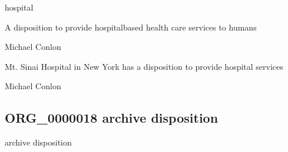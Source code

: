 \documentclass[letterpaper,10pt,english]{sphinxmanual}
\begin{document}
\begin{sphinxShadowBox}

\sphinxAtStartPar
hospital
\end{sphinxShadowBox}

\begin{sphinxShadowBox}

\sphinxAtStartPar
A disposition to provide hospital\sphinxhyphen{}based health care services to humans
\end{sphinxShadowBox}

\begin{sphinxShadowBox}

\sphinxAtStartPar
Michael Conlon 
\end{sphinxShadowBox}

\begin{sphinxShadowBox}

\sphinxAtStartPar
Mt. Sinai Hospital in New York has a disposition to provide hospital services
\end{sphinxShadowBox}

\begin{sphinxShadowBox}

\sphinxAtStartPar
Michael Conlon 
\end{sphinxShadowBox}
\begin{quote}

\ignorespaces \end{quote}


\subsection{ORG\_0000018 \sphinxhyphen{} archive disposition}
\label{\detokenize{doc-ORG_0000018:org-0000018-archive-disposition}}\label{\detokenize{doc-ORG_0000018:index-0}}\label{\detokenize{doc-ORG_0000018::doc}}
\begin{sphinxShadowBox}

\sphinxAtStartPar
archive disposition
\end{sphinxShadowBox}
\end{document}

